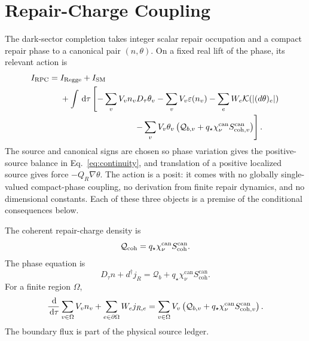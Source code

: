 \documentclass[11pt]{article}
\numberwithin{equation}{section}
\theoremstyle{remark}
\newcommand{\RPC}{\mathrm{RPC}}
\newcommand{\chican}{\chi_\nu^{\mathrm{can}}}
\newcommand{\scohcan}{S_{\mathrm{coh}}^{\mathrm{can}}}
\newcommand{\dd}{\,\mathrm d}
\begin{document}
\section{Repair-Charge Coupling}

The dark-sector completion takes integer scalar repair occupation and a
compact repair phase to a canonical pair \((n,\theta)\). On a fixed real lift
of the phase, its relevant action is
\begin{align}
I_{\RPC}={}&I_{\rm Regge}+I_{\rm SM}
\nonumber\\
&+\int\dd\tau\left[
-\sum_vV_vn_vD_\tau\theta_v
-\sum_vV_v\varepsilon(n_v)
-\sum_eW_e\mathcal K(|(d\theta)_e|)
\right.\nonumber\\
&\hspace{31mm}\left.
-\sum_vV_v\theta_v
\left(\mathcal Q_{b,v}
+q_\star\chican S_{{\rm coh},v}^{\rm can}\right)
\right].
\label{eq:rpc-action}
\end{align}
The source and canonical signs are chosen so phase variation gives the
positive-source balance in Eq.~\eqref{eq:continuity}, and translation of a
positive localized source gives force \(-Q_R\nabla\theta\). The action is a
posit: it comes with no globally single-valued compact-phase coupling, no
derivation from finite repair dynamics, and no dimensional constants. Each of
these three objects is a premise of the conditional consequences below.

The coherent repair-charge density is
\begin{equation}
\mathcal Q_{\rm coh}=q_\star\chican\scohcan.
\label{eq:repair-charge-density}
\end{equation}
The phase equation is
\begin{equation}
D_\tau n+d^\dagger j_R
=\mathcal Q_b+q_\star\chican\scohcan.
\label{eq:continuity}
\end{equation}
For a finite region \(\Omega\),
\begin{equation}
\frac{\dd}{\dd\tau}\sum_{v\in\Omega}V_vn_v
+\sum_{e\in\partial\Omega}W_ej_{R,e}
=\sum_{v\in\Omega}V_v
\left(\mathcal Q_{b,v}+q_\star\chican
S_{{\rm coh},v}^{\rm can}\right).
\label{eq:finite-balance}
\end{equation}
The boundary flux is part of the physical source ledger.
\end{document}
